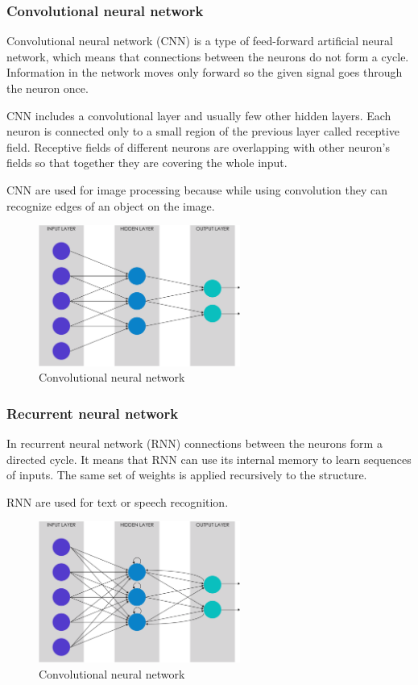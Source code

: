 \documentclass[journal, a4paper]{IEEEtran}
\begin{document}
\subsubsection{Convolutional neural network}
Convolutional neural network (CNN) is a type of feed-forward artificial neural network, which means that connections between the neurons do not form a cycle. Information in the network moves only forward so the given signal goes through the neuron once.
\par CNN includes a convolutional layer and usually few other hidden layers. Each neuron is connected only to a small region of the previous layer called receptive field. Receptive fields of different neurons are overlapping with other neuron's fields so that together they are covering the whole input.
\par CNN are used for image processing because while using convolution they can recognize edges of an object on the image.
\begin{figure}[H]
\centering
\includegraphics[width=250px]{pictures/cnn.png}
\caption{Convolutional neural network}
\end{figure}

\subsubsection{Recurrent neural network}
In recurrent neural network (RNN) connections between the neurons form a directed cycle. It means that RNN can use its internal memory to learn  sequences of inputs. The same set of weights is applied recursively to the structure.
\par RNN are used for text or speech recognition.
\begin{figure}[H]
\centering
\includegraphics[width=250px]{pictures/rnn.png}
\caption{Convolutional neural network}
\end{figure}
\end{document}
